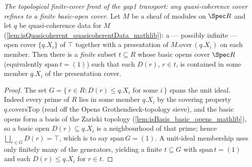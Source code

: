 \begin{lemma}

  \label{lem:exists_finite_basicOpen_cover_le_quasicoherentData}
  \textit{The topological finite-cover front of the gap1 transport: any quasi-coherence cover refines
  to a finite basic-open cover.}
  Let \(M\) be a sheaf of modules on \(\Spec R\) and let \(q\) be quasi-coherence data for \(M\)
  (\cref{lem:isQuasicoherent_quasicoherentData_mathlib}): a — possibly infinite — open cover
  \(\{q.X_i\}\) of \(\top\) together with a presentation of \(M.\mathrm{over}\,(q.X_i)\) on each
  member. Then there is a \emph{finite} subset \(t \subseteq R\) whose basic opens cover \(\Spec R\)
  (equivalently \(\mathrm{span}\,t = (1)\)) such that each \(D(r)\), \(r \in t\), is contained in some
  member \(q.X_i\) of the presentation cover.
\end{lemma}
\begin{proof}
  The set \(G = \{\,r \in R : D(r) \le q.X_i \text{ for some } i\,\}\) spans the unit ideal. Indeed
  every prime of \(R\) lies in some member \(q.X_i\) by the covering property \(q.\mathrm{coversTop}\)
  (read off the \(\mathrm{Opens}\) Grothendieck-topology sieve), and the basic opens form a basis of
  the Zariski topology (\cref{lem:isBasis_basic_opens_mathlib}), so a basic open \(D(r) \subseteq
  q.X_i\) is a neighbourhood of that prime; hence \(\bigsqcup_{r \in G} D(r) = \top\), which is to say
  \(\mathrm{span}\,G = (1)\). A unit-ideal membership uses only finitely many of the generators,
  yielding a finite \(t \subseteq G\) with \(\mathrm{span}\,t = (1)\) and each \(D(r) \le q.X_i\) for
  \(r \in t\).
\end{proof}



